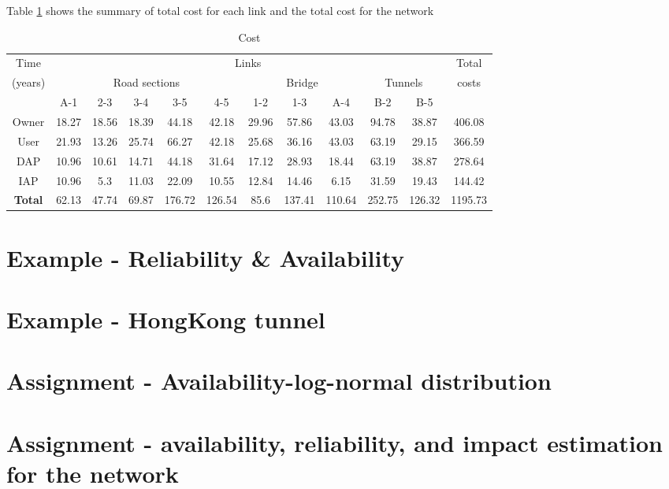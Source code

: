 Table \ref{tblavaimain:15} shows the summary of total cost for each link and the
total cost for the network

\begin{table}[h]
\caption{Cost}
\begin{tabular}{|c|c|c|c|c|c|c|c|c|c|c|c|}
\hline
Time & \multicolumn{10}{c|}{Links} & Total \\ 
\cline{2-11}
(years) & \multicolumn{5}{c|}{Road sections} & \multicolumn{3}{c|}{Bridge} & \multicolumn{2}{c|}{Tunnels} & costs \\ 
\cline{2-11}
 & A-1 & 2-3 & 3-4 & 3-5 & 4-5 & 1-2 & 1-3 & A-4 & B-2 & B-5 &  \\ 
\hline
Owner & 18.27 & 18.56 & 18.39 & 44.18 & 42.18 & 29.96 & 57.86 & 43.03 & 94.78 & 38.87 & 406.08 \\ 
\hline
User & 21.93 & 13.26 & 25.74 & 66.27 & 42.18 & 25.68 & 36.16 & 43.03 & 63.19 & 29.15 & 366.59 \\ 
\hline
DAP & 10.96 & 10.61 & 14.71 & 44.18 & 31.64 & 17.12 & 28.93 & 18.44 & 63.19 & 38.87 & 278.64 \\ 
\hline
IAP & 10.96 & 5.3 & 11.03 & 22.09 & 10.55 & 12.84 & 14.46 & 6.15 & 31.59 & 19.43 & 144.42 \\ 
\hline
\textbf{Total} & 62.13 & 47.74 & 69.87 & 176.72 & 126.54 & 85.6 & 137.41 & 110.64 & 252.75 & 126.32 & 1195.73 \\ 
\hline
\end{tabular}
\label{tblavaimain:15}
\end{table}



\pagebreak

\begin{subappendices}
\section{Example - Reliability \& Availability}\label{appavai-mai1}

\pagebreak
\section{Example - HongKong tunnel}\label{appavai-mai2}

\pagebreak
\section{Assignment - Availability-log-normal distribution}\label{appavai-mai3}

\pagebreak
\section{Assignment - availability, reliability, and impact estimation for the network}\label{appavai-mai3}

\end{subappendices}